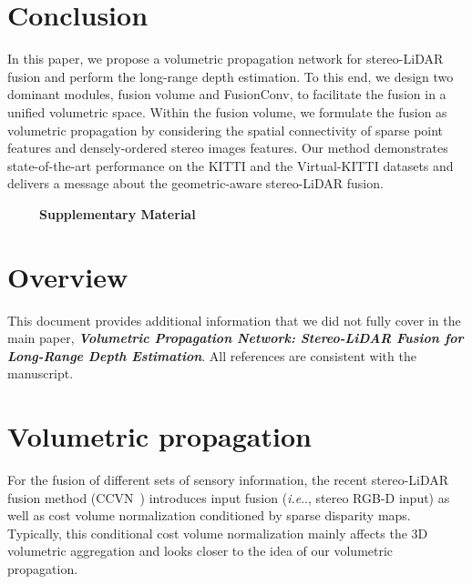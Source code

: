 \documentclass[letterpaper, 10 pt, conference]{ieeeconf}
\makeatletter
\DeclareRobustCommand\onedot{\futurelet\@let@token\@onedot}
\def\@onedot{\ifx\@let@token.\else.\null\fi\xspace}
\def\ie{\emph{i.e}\onedot} \def\Ie{{I.e}\onedot}
\makeatother
\begin{document}
\vspace{-1mm}
\section{Conclusion}
\label{sec:Conclusion}
In this paper, we propose a volumetric propagation network for stereo-LiDAR fusion and perform the long-range depth estimation. To this end, we design two dominant modules, fusion volume and FusionConv, to facilitate the fusion in a unified volumetric space. Within the fusion volume, we formulate the fusion as volumetric propagation by considering the spatial connectivity of sparse point features and densely-ordered stereo images features. Our method demonstrates state-of-the-art performance on the KITTI and the Virtual-KITTI datasets and delivers a message about the geometric-aware stereo-LiDAR fusion.










\newpage


\renewcommand*{\thesection}{\Alph{section}}

\vspace{2mm}
{\LARGE \ \ \ \ \  \textbf{Supplementary Material}}
\vspace{2mm}

\setcounter{section}{0}
\setcounter{figure}{0}
\setcounter{table}{0}



\section{Overview}
This document provides additional information that we did not fully cover in the main paper, \textbf{\textit{Volumetric Propagation Network: Stereo-LiDAR Fusion for Long-Range Depth Estimation}}. All references are consistent with the manuscript. 

\section{Volumetric propagation}
\label{supp-sec:Propagation and triangulation}
For the fusion of different sets of sensory information, the recent stereo-LiDAR fusion method (CCVN~\cite{stereolidar_norm_costV_ccvn}) introduces input fusion (\ie, stereo RGB-D input) as well as cost volume normalization conditioned by sparse disparity maps. Typically, this conditional cost volume normalization mainly affects the 3D volumetric aggregation and looks closer to the idea of our volumetric propagation.
\end{document}
